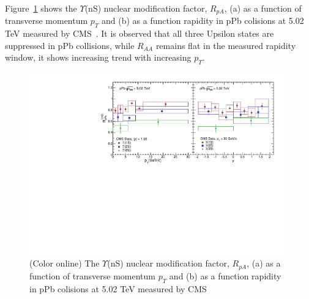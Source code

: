 

Figure~\ref{fig:LHCpPb5} shows the $\Upsilon$(nS) nuclear modification factor, $R_{pA}$,
      (a) as a function of transverse momentum $p_{T}$
    and (b) as a function rapidity in pPb colisions at 5.02 TeV measured by CMS~\cite{CMS:2022wfi}.
    It is observed that all three Upsilon states are suppressed in pPb collisions, while
    $R_{AA}$ remains flat in the measured rapidity window, it shows increasing trend with
    increasing $p_T$.

\begin{figure}
  \includegraphics[width=0.99\textwidth]{Figures/ExpOverview/Fig_LHC_YnSRPPbPtRap.pdf}
     \caption{(Color online) The $\Upsilon$(nS) nuclear modification factor, $R_{pA}$,
      (a) as a function of transverse momentum $p_{T}$
    and (b) as a function rapidity in pPb colisions at 5.02 TeV measured by CMS~\cite{CMS:2022wfi}
  }
  \label{fig:LHCpPb5}
\end{figure}






